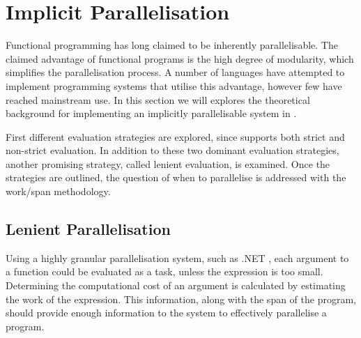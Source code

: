 \section{Implicit Parallelisation}\label{sec:implicit-para}
Functional programming has long claimed to be inherently parallelisable\cite{hudak1986functional, loidl1998granularity}. The claimed advantage of functional programs is the high degree of modularity, which simplifies the parallelisation process. A number of languages have attempted to implement programming systems that utilise this advantage, however few have reached mainstream use. In this section we will explores the theoretical background for implementing an implicitly parallelisable system in \fs.

First different evaluation strategies are explored, since \fs supports both strict and non-strict evaluation. In addition to these two dominant evaluation strategies, another promising strategy, called lenient evaluation, is examined. Once the strategies are outlined, the question of when to parallelise is addressed with the work/span methodology.




\subsection{Lenient Parallelisation}
Using a highly granular parallelisation system, such as .NET , each argument to a function could be evaluated as a task, unless the expression is too small. Determining the computational cost of an argument is calculated by estimating the work of the expression. This information, along with the span of the program, should provide enough information to the system to effectively parallelise a \fs program.
